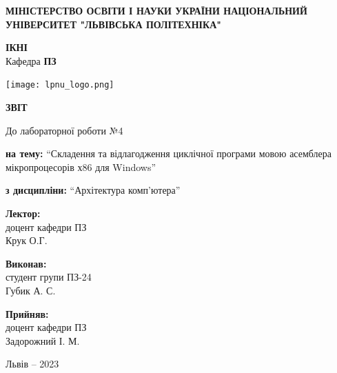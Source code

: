 \documentclass[12pt]{extarticle}
\begin{document}
\begin{titlepage}
    \begin{center}
        \textbf{\normalsize{\MakeUppercase{
            Міністерство Освіти і науки України
            Національний університет "Львівська політехніка"
        }}}

        \begin{flushright}
        \textbf{ІКНІ}\\
        Кафедра \textbf{ПЗ}
        \end{flushright}
        \vspace{15mm}

        \texttt{[image: lpnu\_logo.png]}

        \vspace*{\fill}

        \textbf{\normalsize{\MakeUppercase{Звіт}}}
            
        До лабораторної роботи №4

        \textbf{на тему:} “Складення та відлагодження циклічної програми мовою асемблера
        мікропроцесорів х86 для Windows”

        \textbf{з дисципліни:} “Архітектура комп’ютера”
            
        \vspace*{\fill}

        \begin{flushright}

            \textbf{Лектор:}\\
            доцент кафедри ПЗ\\
            Крук О.Г.\\
            \vspace{12pt}

            \textbf{Виконав:}\\
            студент групи ПЗ-24\\
            Губик А. С.\\
            \vspace{12pt}

            \textbf{Прийняв:}\\
            доцент кафедри ПЗ\\
            Задорожний І. М.\\
        \vspace{12pt}
        \end{flushright}

        Львів -- 2023
            
            
    \end{center}
\end{titlepage}
\end{document}
